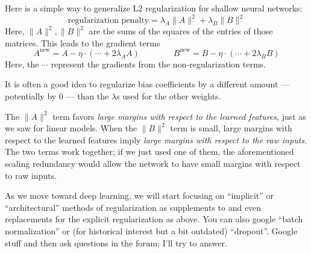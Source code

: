 %
  Here is a simple way to generalize L2 regularization for shallow neural
  networks:
  $$
    \text{regularization penalty} = \lambda_A \|A\|^2 + \lambda_B \|B\|^2
  $$
  Here, $\|A\|^2, \|B\|^2$ are the sums of the squares of the entries of those
  matrices.
  This leads to the gradient terms
  $$
    A^{\text{new}} = A - \eta \cdot ( \cdots + 2\lambda_A A)
    \quad
    \quad
    \quad
    \quad
    B^{\text{new}} = B - \eta \cdot ( \cdots + 2\lambda_B B)
  $$
  Here, the $\cdots$ represent the gradients from the non-regularization terms.

  It is often a good idea to regularize bias coefficients by a different amount
  --- potentially by $0$ --- than the $\lambda$s used for the other weights.


  The $\|A\|^2$ term favors \emph{large margins with respect to the learned
  features}, just as we saw for linear models.  When the $\|B\|^2$ term is
  small, large margins with respect to the learned features imply \emph{large
  margins with respect to the raw inputs}.  The two terms work together; if we
  just used one of them, the aforementioned scaling redundancy would allow the
  network to have small margins with respect to raw inputs.

  As we move toward deep learning, we will start focusing on ``implicit'' or
  ``architectural'' methods of regularization as supplements to and even
  replacements for the explicit regularization as above.
  You can also google ``batch normalization'' or (for historical interest but a
  bit outdated) ``dropout''.  Google stuff and then ask questions in the forum;
  I'll try to answer.

